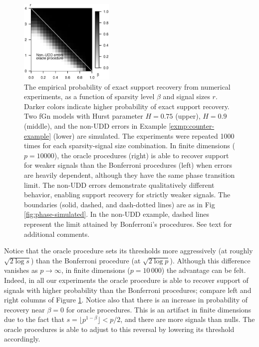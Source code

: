 \begin{figure}
    \includegraphics[width=0.4\textwidth]{./figures/simulated_phase_diagram_block_structure_p10000_oracle6.eps}
    \caption{The empirical probability of exact support recovery from numerical experiments, as a function of sparsity level $\beta$ and signal sizes $r$. Darker colors indicate higher probability of exact support recovery. 
    Two fGn models with Hurst parameter $H = 0.75$ (upper), 
    $H = 0.9$ (middle), and the non-UDD errors in Example \ref{exmp:counter-example} (lower) are simulated.
    The experiments were repeated 1000 times for each sparsity-signal size combination.
    In finite dimensions ($p=10000$), the oracle procedures (right) is able to recover support for weaker signals than the Bonferroni procedures (left) when errors are heavily dependent, although they have the same phase transition limit.
    The non-UDD errors demonstrate qualitatively different behavior, enabling support recovery for strictly weaker signals.
    The boundaries (solid, dashed, and dash-dotted lines) are as in Fig \ref{fig:phase-simulated}.
    In the non-UDD example, dashed lines represent the limit attained by Bonferroni's procedures.
    See text for additional comments.}
    \label{fig:phase-simulated-very-dependent}
\end{figure}


Notice that the oracle procedure sets its thresholds more aggressively (at roughly $\sqrt{2\log s}$) than the Bonferroni procedure (at $\sqrt{2\log p}$).
Although this difference vanishes as $p\to\infty$, in finite dimensions ($p=10\,000$) the advantage can be felt. 
Indeed, in all our experiments the oracle procedure is able to recover support of signals with higher probability than the Bonferroni procedures; compare left and right columns of Figure  \ref{fig:phase-simulated-very-dependent}.
Notice also that there is an increase in probability of recovery near $\beta=0$ for oracle procedures.
This is an artifact in finite dimensions due to the fact that $s = \lfloor p^{1-\beta}\rfloor < p/2$, and there are more signals than nulls. The oracle procedures is able to adjust to this reversal by lowering its threshold accordingly.

